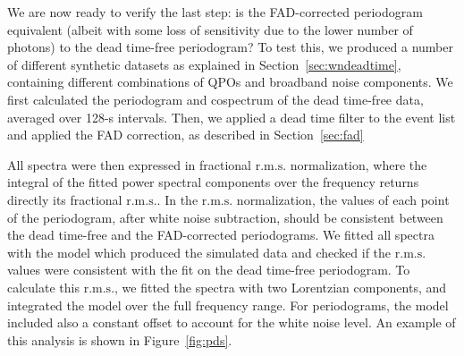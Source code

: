 \documentclass[twocolumn]{aastex61}
\newcommand{\project}[1]{\textsl{#1}}
\newcommand{\nustar}{\project{NuSTAR}\xspace}
\newcommand{\rms}{\ensuremath{\mathrm{r.m.s.}}\xspace}
\begin{document}
\begin{figure*}
    \caption{Periodograms and cospectra from a simulation with four Lorentzian features (at 50, 200, 300 and 400 Hz) with 40-Hz full with at half maximum (FWHM). 
    We plotted and fitted periodograms and cospectra before and after applying the dead time filter
    The total \rms before dead time was 40\% and the incident photon flux 400 ct/s. 
    After applying a dead time of 2.5 ms like in \nustar, the ``detected'' photon flux decreased to $\sim$200 ct/s as expected. 
    As can be seen from the best-fit curves, there is no significant difference between FAD-normalized and deadtime-free periodograms and cospectra.
    For comparison, we also plot the cospectrum without FAD (pink), showing very different amplitudes for the four Lorentzians, due to dead time.
    }
    \label{fig:pds}
\end{figure*}

We are now ready to verify the last step: is the FAD-corrected periodogram equivalent (albeit with some loss of sensitivity due to the lower number of photons) to the dead time-free periodogram?
To test this, we produced a number of different synthetic datasets as explained in Section~\ref{sec:wndeadtime}, containing different combinations of QPOs and broadband noise components. 
We first calculated the periodogram and cospectrum of the dead time-free data, averaged over 128-s intervals.
Then, we applied a dead time filter to the event list and applied the FAD correction, as described in Section~\ref{sec:fad}

All spectra were then expressed in fractional \rms \citep{BelloniHasinger90,Miyamoto+91} normalization, where the integral of the fitted power spectral components over the frequency returns directly its fractional \rms.
In the \rms normalization, the values of each point of the periodogram, after white noise subtraction, should be consistent between the dead time-free and the FAD-corrected periodograms.
We fitted all spectra with the model which produced the simulated data and checked if the \rms values were consistent with the fit on the dead time-free periodogram.
To calculate this \rms, we fitted the spectra with two Lorentzian components, and integrated the model over the full frequency range.
For periodograms, the model included also a constant offset to account for the white noise level.
An example of this analysis is shown in Figure~\ref{fig:pds}.
\end{document}
